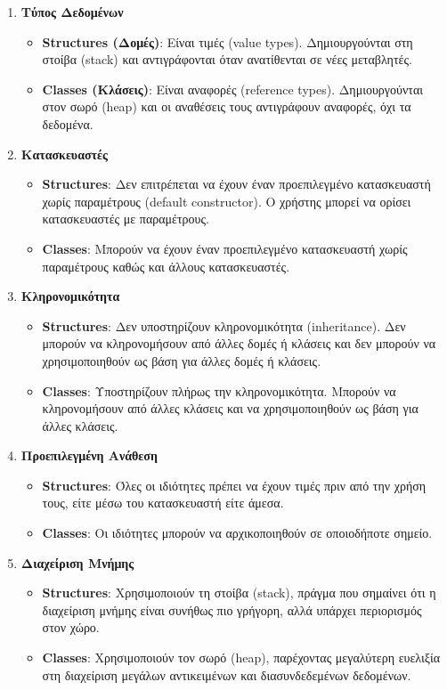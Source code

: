 \begin{enumerate}
    \item \textbf{Τύπος Δεδομένων}
    \begin{itemize}
        \item \textbf{Structures (Δομές)}: Είναι τιμές (value types). Δημιουργούνται στη στοίβα (stack) και αντιγράφονται όταν ανατίθενται σε νέες μεταβλητές.
        \item \textbf{Classes (Κλάσεις)}: Είναι αναφορές (reference types). Δημιουργούνται στον σωρό (heap) και οι αναθέσεις τους αντιγράφουν αναφορές, όχι τα δεδομένα.
    \end{itemize}

    \item \textbf{Κατασκευαστές}
    \begin{itemize}
        \item \textbf{Structures}: Δεν επιτρέπεται να έχουν έναν προεπιλεγμένο κατασκευαστή χωρίς παραμέτρους (default constructor). Ο χρήστης μπορεί να ορίσει κατασκευαστές με παραμέτρους.
        \item \textbf{Classes}: Μπορούν να έχουν έναν προεπιλεγμένο κατασκευαστή χωρίς παραμέτρους καθώς και άλλους κατασκευαστές.
    \end{itemize}

    \item \textbf{Κληρονομικότητα}
    \begin{itemize}
        \item \textbf{Structures}: Δεν υποστηρίζουν κληρονομικότητα (inheritance). Δεν μπορούν να κληρονομήσουν από άλλες δομές ή κλάσεις και δεν μπορούν να χρησιμοποιηθούν ως βάση για άλλες δομές ή κλάσεις.
        \item \textbf{Classes}: Υποστηρίζουν πλήρως την κληρονομικότητα. Μπορούν να κληρονομήσουν από άλλες κλάσεις και να χρησιμοποιηθούν ως βάση για άλλες κλάσεις.
    \end{itemize}

    \item \textbf{Προεπιλεγμένη Ανάθεση}
    \begin{itemize}
        \item \textbf{Structures}: Όλες οι ιδιότητες πρέπει να έχουν τιμές πριν από την χρήση τους, είτε μέσω του κατασκευαστή είτε άμεσα.
        \item \textbf{Classes}: Οι ιδιότητες μπορούν να αρχικοποιηθούν σε οποιοδήποτε σημείο.
    \end{itemize}

    \item \textbf{Διαχείριση Μνήμης}
    \begin{itemize}
        \item \textbf{Structures}: Χρησιμοποιούν τη στοίβα (stack), πράγμα που σημαίνει ότι η διαχείριση μνήμης είναι συνήθως πιο γρήγορη, αλλά υπάρχει περιορισμός στον χώρο.
        \item \textbf{Classes}: Χρησιμοποιούν τον σωρό (heap), παρέχοντας μεγαλύτερη ευελιξία στη διαχείριση μεγάλων αντικειμένων και διασυνδεδεμένων δεδομένων.
    \end{itemize}


\end{enumerate}
